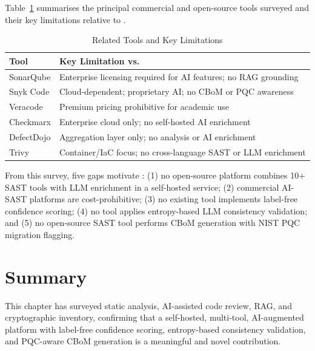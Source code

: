 Table~\ref{tab:related_tools} summarises the principal commercial and open-source tools surveyed and their key limitations relative to \ACRQA{}.

\begin{table}[htbp]
\caption{Related Tools and Key Limitations}
\label{tab:related_tools}
\centering
\small
\renewcommand{\arraystretch}{1.25}
\begin{tabularx}{\textwidth}{@{} l X @{}}
\toprule
\textbf{Tool} & \textbf{Key Limitation vs.\ \ACRQA{}} \\
\midrule
SonarQube \cite{sonarqube}  & Enterprise licensing required for AI features; no RAG grounding \\
Snyk Code \cite{snyk}       & Cloud-dependent; proprietary AI; no CBoM or PQC awareness \\
Veracode \cite{veracode}    & Premium pricing prohibitive for academic use \\
Checkmarx \cite{checkmarx} & Enterprise cloud only; no self-hosted AI enrichment \\
DefectDojo \cite{defectdojo} & Aggregation layer only; no analysis or AI enrichment \\
Trivy \cite{trivy}          & Container/IaC focus; no cross-language SAST or LLM enrichment \\
\bottomrule
\end{tabularx}
\end{table}

From this survey, five gaps motivate \ACRQA{}: (1) no open-source platform combines 10+ SAST tools with LLM enrichment in a self-hosted service; (2) commercial AI-SAST platforms are cost-prohibitive; (3) no existing tool implements label-free confidence scoring; (4) no tool applies entropy-based LLM consistency validation; and (5) no open-source SAST tool performs CBoM generation with NIST PQC migration flagging.

\section{Summary}

This chapter has surveyed static analysis, AI-assisted code review, RAG, and cryptographic inventory, confirming that a self-hosted, multi-tool, AI-augmented platform with label-free confidence scoring, entropy-based consistency validation, and PQC-aware CBoM generation is a meaningful and novel contribution.

\clearpage
